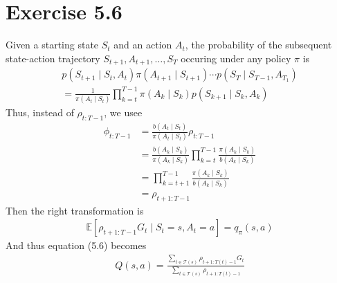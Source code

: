 \documentclass[a4paper,11pt,reqno]{amsart}
\newcounter{prob_counter}
\begin{document}
\section*{Exercise 5.6}
Given a starting state $S_t$ and an action $A_t$, the probability of the subsequent state-action trajectory $S_{t + 1}, A_{t+1}, \ldots, S_T$ occuring under any policy $\pi $ is
\begin{align}
p(S_{t+1} \mid S_{t}, A_{t})\pi (A_{t+1} \mid S_{t+1}) \cdots p(S_{T} \mid S_{T-1}, A_{T_1})\\
=\frac{1}{\pi (A_t \mid S_t)} \prod_{k=t}^{T - 1}\pi (A_k \mid S_k)  p(S_{k + 1} \mid S_k, A_k)
\end{align}
Thus, instead of $\rho _{t: T - 1}$, we usee
\begin{align}
    \phi_{t:T -1} &= \frac{b(A_t \mid S_t)}{\pi (A_t \mid S_t)}\rho _{t:T-1}\\
    &= \frac{b(A_k \mid S_k)}{\pi (A_k \mid S_k)} \prod_{k=t}^{T-1}\frac{\pi (A_k \mid S_k)}{b(A_k \mid S_k)}   \\
    &= \prod_{k=t+1}^{T-1} \frac{\pi (A_k \mid S_k)}{b(A_k \mid S_k)}\\
    &= \rho _{t+ 1: T - 1} 
\end{align}
Then the right transformation is
\begin{align}
\mathbb{E}\left[ \rho _{t + 1: T - 1}G_t \mid S_t=s, A_t = a \right]  = q_{\pi }(s, a)
\end{align}
And thus equation (5.6) becomes
\begin{align}
    Q(s,a) = \frac{
        \sum_{t \in \mathcal{T}(s)} \rho _{t + 1 : T(t) - 1}G_t
    }{
        \sum_{t \in \mathcal{T}(s)} \rho _{t+1:T(t) - 1}
    }
\end{align}
\end{document}
